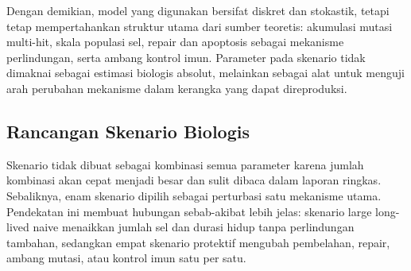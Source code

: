 Dengan demikian, model yang digunakan bersifat diskret dan stokastik, tetapi
tetap mempertahankan struktur utama dari sumber teoretis: akumulasi mutasi
multi-hit, skala populasi sel, repair dan apoptosis sebagai mekanisme
perlindungan, serta ambang kontrol imun. Parameter pada skenario tidak dimaknai
sebagai estimasi biologis absolut, melainkan sebagai alat untuk menguji arah
perubahan mekanisme dalam kerangka yang dapat direproduksi.

\subsection{Rancangan Skenario Biologis}

Skenario tidak dibuat sebagai kombinasi semua parameter karena jumlah kombinasi
akan cepat menjadi besar dan sulit dibaca dalam laporan ringkas. Sebaliknya,
enam skenario dipilih sebagai perturbasi satu mekanisme utama. Pendekatan ini
membuat hubungan sebab-akibat lebih jelas: skenario large long-lived naive
menaikkan jumlah sel dan durasi hidup tanpa perlindungan tambahan, sedangkan
empat skenario protektif mengubah pembelahan, repair, ambang mutasi, atau
kontrol imun satu per satu.

\begin{table}[t]
\centering
\caption{Pemetaan parameter simulasi ke interpretasi biologis dan sumber teori.}
\label{tab:parameter-mapping}
\end{table}

